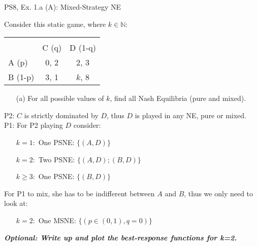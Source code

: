 \begin{frame}{PS8, Ex. 1.a (A): Mixed-Strategy NE}
    \begin{multicols}{2}
      Consider this static game, where $k\in\mathbb{N}:$
      \vspace{-16pt}
      \begin{table}
        \begin{tabular}{l|c|c|}
          \multicolumn{1}{c}{} & \multicolumn{2}{c}{} \\
          \multicolumn{1}{c}{} & \multicolumn{1}{c}{C (q)} & \multicolumn{1}{c}{\color{blue}D (1-q)} \\\cline{2-3}
          A (p)   & 0, 2 & 2, \color{blue}3 \\\cline{2-3}
          B (1-p) & 3, 1 & $k$, \color{blue}8 \\\cline{2-3}
        \end{tabular}
      \end{table}
      \begin{itemize}
        \item[(a)] For all possible values of $k$, find all Nash Equilibria (pure and mixed).
      \end{itemize}
      P2: $C$ is strictly dominated by $D$, thus $D$ is played in any NE, pure or mixed.\\\medskip
      P1: For P2 playing $D$ consider:
      \begin{itemize}
        \item[$k=1:$] One PSNE: $\{(A,D)\}$
        \item[$k=2:$] Two PSNE: $\{(A,D);(B,D)\}$
        \item[$k\geq3:$] One PSNE: $\{(B,D)\}$
      \end{itemize}
      For P1 to mix, she has to be indifferent between $A$ and $B$, thus we only need to look at:
      \begin{itemize}
        \item[$k=2:$] One MSNE: $\{(p\in(0,1),q=0)\}$
      \end{itemize}
      \vfill\null\columnbreak
      \textbf{\textit{Optional: Write up and plot the best-response functions for k=2.}}
      \vfill\null
    \end{multicols}
\end{frame}
